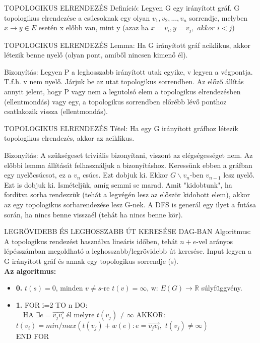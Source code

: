 \documentclass[]{article}
\begin{document}
\begin{shaded}
TOPOLOGIKUS ELRENDEZÉS Definíció: Legyen G egy irányított gráf. G topologikus elrendezése a csúcsoknak egy olyan $v_1, v_2,..., v_n$ sorrendje, melyben $x\rightarrow y \in E$ esetén x előbb van, mint y (azaz ha $x = v_i, y = v_j,\,\,akkor\,\,i<j$)
\end{shaded}
\begin{framed}
TOPOLOGIKUS ELRENDEZÉS Lemma: Ha G irányított gráf aciklikus, akkor létezik benne nyelő (olyan pont, amiből nincsen kimenő él).
\end{framed}
\begin{leftbar}
Bizonyítás: Legyen P a leghosszabb irányított utak egyike, v legyen a végpontja. T.f.h. v nem nyelő. Járjuk be az utat topologikus sorrendben. Az előző állítás annyit jelent, hogy P vagy nem a legutolsó elem a topologikus elrendezésben (ellentmondás) vagy egy, a topologikus sorrendben előrébb lévő ponthoz csatlakozik vissza (ellentmondás).
\end{leftbar}
\begin{framed}
TOPOLOGIKUS ELRENDEZÉS Tétel: Ha egy G irányított gráfhoz létezik topologikus elrendezés, akkor az aciklikus.
\end{framed}
\begin{leftbar}
Bizonyítás: A szükségeset triviális bizonyítani, viszont az elégségességet nem. Az előbbi lemma állítását felhasználjuk a bizonyításhoz. Keressünk ebben a gráfban egy nyelőcsúcsot, ez a $v_n$ csúcs. Ezt dobjuk ki. Ekkor $G\backslash{v_n}$-ben $v_{n-1}$ lesz nyelő. Ezt is dobjuk ki. Ismételjük, amíg semmi se marad. Amit "kidobtunk", ha fordítva sorba rendezzük (tehát a legvégén lesz az először kidobott elem), akkor az egy topologikus sorbarendezése lesz G-nek. A DFS is generál egy ilyet a futása során, ha nincs benne visszaél (tehát ha nincs benne kör).
\end{leftbar}
\begin{framed}
LEGRÖVIDEBB ÉS LEGHOSSZABB ÚT KERESÉSE DAG-BAN Algoritmus: A topologikus rendezést használva lineáris időben, tehát $n+e$-vel arányos lépésszámban megoldható a leghosszabb/legrövidebb út keresése.
Input legyen a G irányított gráf és annak egy topologikus sorrendje (s).
\\
\textbf{Az algoritmus:}
\begin{itemize}
\item{\textbf{0.}} $t(s) = 0$, minden $v \neq s$-re $t(v) = \infty$, w: $E(G)\rightarrow \mathbb{R}$ súlyfüggvény.
\item{\textbf{1.}} FOR i=2 TO n DO:\\
	$\quad$HA $\exists e = \overrightarrow{v_jv_i}$ él melyre $t(v_j) \neq \infty$ AKKOR: $t(v_i) = min/max(t(v_j)+w(e): e = \overrightarrow{v_jv_i},\,\, t(v_j) \neq \infty)$
\\END FOR
\end{itemize}
\end{framed}
\end{document}
